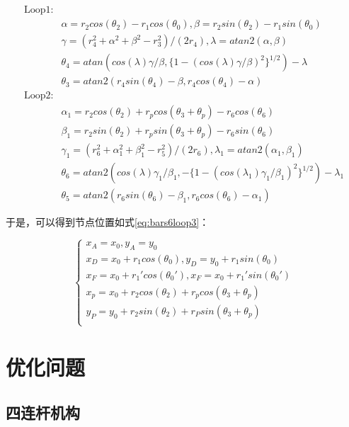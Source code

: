\documentclass[]{ctexbook}
\theoremstyle{definition}
\theoremstyle{definition}
\theoremstyle{definition}
\theoremstyle{remark}
\begin{document}
\begin{equation}
\begin{split}
\text{Loop1:}\\
&\alpha = r_2cos(\theta_2) - r_1cos(\theta_0), \beta = r_2sin(\theta_2)-r_1sin(\theta_0) \\
&\gamma = (r_4^2+\alpha^2+\beta^2-r_3^2)/(2r_4),\lambda=atan2(\alpha,\beta)\\
&\theta_4 = atan(cos(\lambda)\gamma/\beta,\{1-(cos(\lambda)\gamma/\beta)^2\}^{1/2})-\lambda\\
&\theta_3=atan2(r_4sin(\theta_4)-\beta,r_4cos(\theta_4)-\alpha)\\
\text{Loop2:}\\
&\alpha_1 = r_2cos(\theta_2)+r_pcos(\theta_3+\theta_p)-r_6cos(\theta_6)\\
&\beta_1=r_2sin(\theta_2)+r_psin(\theta_3+\theta_p)-r_6sin(\theta_6)\\
&\gamma_1=(r_6^2+\alpha_1^2+\beta_1^2-r_5^2)/(2r_6),\lambda_1=atan2(\alpha_1,\beta_1)\\
&\theta_6=atan2(cos(\lambda)\gamma_1/\beta_1,-\{1-(cos(\lambda_1)\gamma_1/\beta_1)^{2}\}^{1/2}) - \lambda_1\\
&\theta_5 = atan2(r_6sin(\theta_6)-\beta_1,r_6cos(\theta_6)-\alpha_1)
\end{split}
\label{eq:bars6loop2}
\end{equation}

于是，可以得到节点位置如式\eqref{eq:bars6loop3}：

\begin{equation}
\begin{cases} 
x_A = x_0,y_A = y_0 \\
x_D = x_0+r_1cos(\theta_0),y_D = y_0+r_1sin(\theta_0)\\
x_F = x_0+r_1'cos(\theta_0'),x_F = x_0 + r_1'sin(\theta_0')\\
x_p = x_0 + r_2cos(\theta_2) + r_pcos(\theta_3+\theta_p)\\
y_P = y_0 + r_2sin(\theta_2)+r_Psin(\theta_3+\theta_p)\\
\end{cases}
\label{eq:bars6loop3}
\end{equation}

\section{优化问题}

\subsection{四连杆机构}\label{bars4optim}
\end{document}

